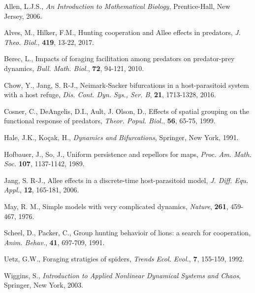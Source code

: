 \documentclass[11pt]{article}
\begin{document}
\begin{thebibliography}{99}

 Allen,  L.J.S., {\em An Introduction to Mathematical Biology},
Prentice-Hall, New Jersey, 2006.


 Alves, M., Hilker, F.M., Hunting cooperation and
Allee effects in predators, {\em J. Theo. Biol.}, {\bf 419},
13-22, 2017.


 Berec, L., Impacts of foraging facilitation among
predators on predator-prey dynamics, {\em Bull. Math. Biol.}, {\bf
72}, 94-121, 2010.

 Chow, Y.,  Jang, S. R-J., Neimark-Sacker bifurcations in a
host-parasitoid system with a host refuge, {\em Dis. Cont. Dyn.
Sys., Ser. B}, {\bf 21}, 1713-1328, 2016.


 Cosner, C., DeAngelis, D.I., Ault, J. Olson, D.,
Effects of spatial grouping on the functional response of
predators, {\em Theor. Popul. Biol.}, {\bf 56}, 65-75, 1999.


  Hale, J.K., Ko\c{c}ak, H., {\em  Dynamics and Bifurcations}, Springer, New York, 1991.



 Hofbauer, J., So, J., Uniform persistence and repellors for
maps, {\em Proc. Am. Math. Soc.} {\bf 107}, 1137-1142, 1989.


  Jang, S. R-J., Allee effects in a discrete-time host-parasitoid
model, {\em J. Diff. Equ.  Appl.}, {\bf 12}, 165-181, 2006.

 May, R. M.,  Simple models with very complicated
dynamics, {\em Nature}, {\bf 261}, 459-467, 1976.

 Scheel, D., Packer, C., Group hunting behavioir
of lions: a search for cooperation, {\em Anim. Behav.}, {\bf 41},
697-709, 1991.

 Uetz, G.W., Foraging stratigies of spiders, {\em
Trends Ecol. Evol.}, {\bf 7}, 155-159, 1992.

  Wiggins, S., {\em Introduction to Applied Nonlinear Dynamical Systems and Chaos},
Springer, New York, 2003.

\end{thebibliography}

\end{document}
